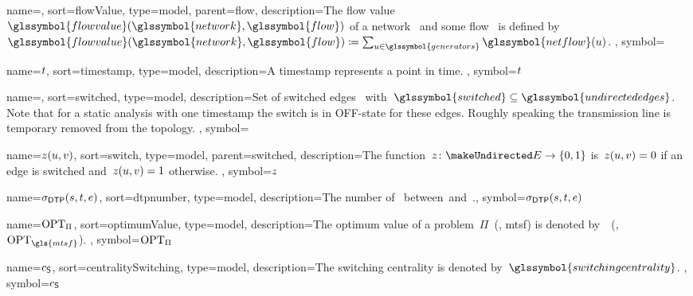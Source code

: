{
    name={\flowvalue},
    sort={flowValue},
    type={model},
    parent={flow},
    description={The flow
    value~$\glssymbol{flowvalue}(\glssymbol{network},\glssymbol{flow})$ of a
    network~ and some flow~ is defined
    by~$\glssymbol{flowvalue}(\glssymbol{network},\glssymbol{flow})\coloneqq\sum_{\vertexa\in\glssymbol{generators}}\glssymbol{netflow}(\vertexa)$.
    },
    symbol={\flowvalue}
}

{
    name={\ensuremath{\timestamp}},
    sort={timestamp},
    type={model},
    description={A timestamp represents a point in time.
    },
    symbol={\ensuremath{\timestamp}}
}

{
    name={\switched},
    sort={switched},
    type={model},
    description={Set of switched edges~
    with~$\glssymbol{switched}\subseteq\glssymbol{undirectededges}$. Note that
    for a static analysis with one timestamp the switch is in OFF-state for
    these edges. Roughly speaking the transmission line is temporary removed
    from the topology.
    },
    symbol={\switched}
}

{
    name={\ensuremath{\switch(\vertexa,\vertexb)}},
    sort={switch},
    type={model},
    parent={switched},
    description={The function~$\switch\colon\undirectededges\to\{0,1\}$ 
    is~$z(u,v) = 0$ if an edge is switched and~$z
    (u,v) = 1$ otherwise.
    },
    symbol={\ensuremath{\switch}}
}

{
    name={\ensuremath{\sigma_{\dtp}(\source, \sink, \edge)}},
    sort={dtpnumber},
    type={model},
    description={The number of~ between~\source and~\sink.},
    symbol={\ensuremath{\sigma_{\dtp}(\source, \sink, \edge)}}
}

{
    name={\ensuremath{\opt_\Pi}},
    sort={optimumValue},
    type={model},
    description={The optimum value of a problem~$\Pi$~(\eg, \gls{mtsf}) is
    denoted by~~(\eg, $\opt_{\gls{mtsf}}$).
    },
    symbol={\ensuremath{\opt_\Pi}}
}

{
    name={\ensuremath{ c_{\scu} }},
    sort={centralitySwitching},
    type={model},
    description={The switching centrality is denoted
    by~$\glssymbol{switchingcentrality}$.
    },
    symbol={\ensuremath{ c_{\scu} }}
}

